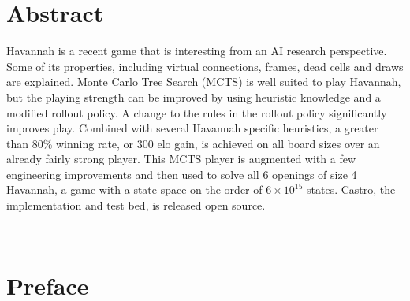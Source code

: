 
  \newpage
  \chapter*{Abstract}
  \thispagestyle{empty}
  \vspace*{-0.7in}
  \renewcommand{\baselinestretch}{1.8}
  \normalsize{

Havannah is a recent game that is interesting from an AI research perspective. Some of its properties, including virtual connections, frames, dead cells and draws are explained. Monte Carlo Tree Search (MCTS) is well suited to play Havannah, but the playing strength can be improved by using heuristic knowledge and a modified rollout policy. A change to the rules in the rollout policy significantly improves play. Combined with several Havannah specific heuristics, a greater than 80\% winning rate, or 300 elo gain, is achieved on all board sizes over an already fairly strong player. This MCTS player is augmented with a few engineering improvements and then used to solve all 6 openings of size 4 Havannah, a game with a state space on the order of $6 \times 10^{15}$ states. Castro, the implementation and test bed, is released open source.

  } \vspace*{-0.2in} \\

  \renewcommand{\baselinestretch}{1.33}

  \newpage
  \chapter*{Preface}
  \thispagestyle{empty}
  \vspace*{-0.7in}

